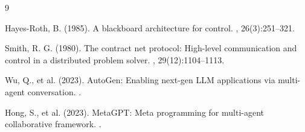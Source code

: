 \documentclass[11pt,a4paper]{article}
\begin{document}

\begin{thebibliography}{9}

Hayes-Roth, B. (1985).
\newblock A blackboard architecture for control.
, 26(3):251--321.

Smith, R. G. (1980).
\newblock The contract net protocol: High-level communication and control in a distributed problem solver.
, 29(12):1104--1113.

Wu, Q., et al. (2023).
\newblock AutoGen: Enabling next-gen LLM applications via multi-agent conversation.
.

Hong, S., et al. (2023).
\newblock MetaGPT: Meta programming for multi-agent collaborative framework.
.

\end{thebibliography}
\end{document}
